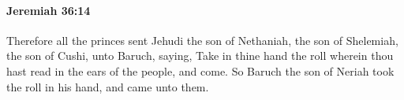 
		\paragraph{Jeremiah 36:14} %
			\label{JEREMIAH-36-14}

			Therefore all the princes sent Jehudi the son of Nethaniah, the son of Shelemiah, the son of Cushi, unto Baruch, saying, Take in thine hand the roll wherein thou hast read in the ears of the people, and come. So Baruch the son of Neriah took the roll in his hand, and came unto them.


